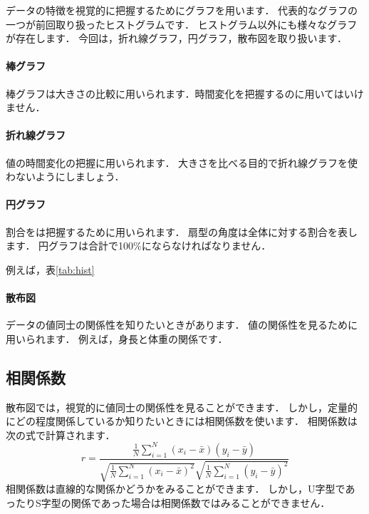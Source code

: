 \documentclass[12pt, a4j]{jsreport}
\begin{document}
データの特徴を視覚的に把握するためにグラフを用います．
代表的なグラフの一つが前回取り扱ったヒストグラムです．
ヒストグラム以外にも様々なグラフが存在します．
今回は，折れ線グラフ，円グラフ，散布図を取り扱います．

\paragraph{棒グラフ}

棒グラフは大きさの比較に用いられます．時間変化を把握するのに用いてはいけません．

\paragraph{折れ線グラフ}

値の時間変化の把握に用いられます．
大きさを比べる目的で折れ線グラフを使わないようにしましょう．

\paragraph{円グラフ}

割合をは把握するために用いられます．
扇型の角度は全体に対する割合を表します．
円グラフは合計で100\%にならなければなりません．

例えば，表\ref{tab:hist}

\paragraph{散布図}

データの値同士の関係性を知りたいときがあります．
値の関係性を見るために用いられます．
例えば，身長と体重の関係です．


\subsection{相関係数}

散布図では，視覚的に値同士の関係性を見ることができます．
しかし，定量的にどの程度関係しているか知りたいときには相関係数を使います．
相関係数は次の式で計算されます．
\begin{equation}
    \label{eq:1}
    r = \frac{\frac{1}{N} \sum_{i=1}^N (x_i - \bar{x})(y_i - \bar{y})}{\sqrt{\frac{1}{N} \sum_{i=1}^N (x_i - \bar{x})^2} \sqrt{\frac{1}{N} \sum_{i=1}^N(y_i - \bar{y})^2}}
\end{equation}
相関係数は直線的な関係かどうかをみることができます．
しかし，U字型であったりS字型の関係であった場合は相関係数ではみることができません．
\end{document}

